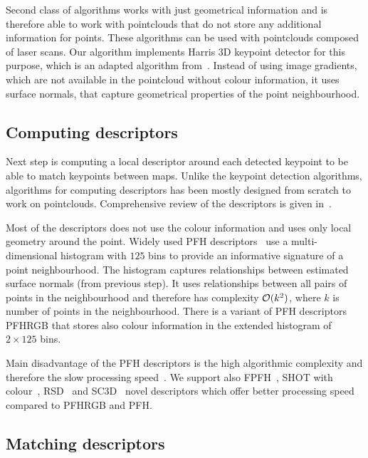 Second class of algorithms works with just geometrical information and is therefore able to work with pointclouds that do not store any additional information for points. These algorithms can be used with pointclouds composed of laser scans. Our algorithm implements Harris 3D keypoint detector for this purpose, which is an adapted algorithm from~\cite{harris1988combined}. Instead of using image gradients, which are not available in the pointcloud without colour information, it uses surface normals, that capture geometrical properties of the point neighbourhood.

\subsection{Computing descriptors}

Next step is computing a local descriptor around each detected keypoint to be able to match keypoints between maps. Unlike the keypoint detection algorithms, algorithms for computing descriptors has been mostly designed from scratch to work on pointclouds. Comprehensive review of the descriptors is given in~\cite{YasirThesis}.

Most of the descriptors does not use the colour information and uses only local geometry around the point. Widely used \gls{PFH} descriptors~\cite{rusu2008pfh} use a multi-dimensional histogram with $125$ bins to provide an informative signature of a point neighbourhood. The histogram captures relationships between estimated surface normals (from previous step). It uses relationships between all pairs of points in the neighbourhood and therefore has complexity $\operatorname{\mathcal{O}}(k^2)$, where $k$ is number of points in the neighbourhood. There is a variant of \gls{PFH} descriptors \gls{PFHRGB} that stores also colour information in the extended histogram of $2 \times 125$ bins.

Main disadvantage of the \gls{PFH} descriptors is the high algorithmic complexity and therefore the slow processing speed~\cite{rusu2009fpfh}. We support also \gls{FPFH}~\cite{rusu2009fpfh}, \gls{SHOT} with colour~\cite{tombari2011shot}, \gls{RSD}~\cite{marton2010rsd} and \gls{SC3D}~\cite{frome2004sc3d} novel descriptors which offer better processing speed compared to \gls{PFHRGB} and \gls{PFH}.

\subsection{Matching descriptors}
\label{sec:matching}

